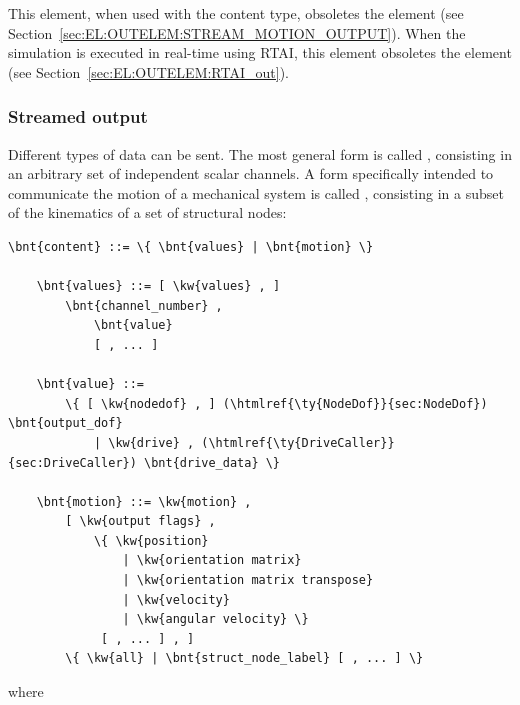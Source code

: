 This element, when used with the  content type,
obsoletes the  element
(see Section~\ref{sec:EL:OUTELEM:STREAM_MOTION_OUTPUT}).
When the simulation is executed in real-time using RTAI,
this element obsoletes the  element
(see Section~\ref{sec:EL:OUTELEM:RTAI_out}).



\subsubsection{Streamed output}
Different types of data can be sent.
The most general form is called , consisting
in an arbitrary set of independent scalar channels.
A form specifically intended to communicate the motion
of a mechanical system is called , consisting
in a subset of the kinematics of a set of structural nodes:
\begin{Verbatim}[commandchars=\\\{\}]
    \bnt{content} ::= \{ \bnt{values} | \bnt{motion} \}

    \bnt{values} ::= [ \kw{values} , ]
        \bnt{channel_number} ,
            \bnt{value}
            [ , ... ]

    \bnt{value} ::=
        \{ [ \kw{nodedof} , ] (\htmlref{\ty{NodeDof}}{sec:NodeDof}) \bnt{output_dof}
            | \kw{drive} , (\htmlref{\ty{DriveCaller}}{sec:DriveCaller}) \bnt{drive_data} \}

    \bnt{motion} ::= \kw{motion} ,
        [ \kw{output flags} ,
            \{ \kw{position}
                | \kw{orientation matrix}
                | \kw{orientation matrix transpose}
                | \kw{velocity}
                | \kw{angular velocity} \}
             [ , ... ] , ]
        \{ \kw{all} | \bnt{struct_node_label} [ , ... ] \}
\end{Verbatim}
where
